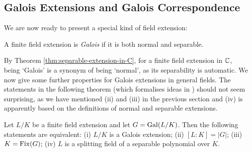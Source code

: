 
 \subsection{Galois Extensions and Galois Correspondence}


We are now ready to present a special kind of field extension:

\begin{definition}
    A finite field extension is \textit{Galois} if it is both normal and separable. 
\end{definition}

By Theorem \ref{thm:separable-extension-in-C}, for a finite field extension in $\mathbb C$, being `Galois' is a synonym of being `normal', as its separability is automatic. 
We now give some further properties for Galois extensions in general fields. The statements in the following theorem (which formalises ideas in \cite[Lecture~8]{galois-theory-lectures}) should not seem surprising, as we have mentioned (ii) and (iii) in the previous section and (iv) is apparently based on the definitions of normal and separable extensions. 


\begin{theorem} \label{thm:fixed}
	Let $L/K$ be a finite field extension and let $G = \operatorname{Gal}(L/K)$. Then the following statements are equivalent:
 	(i) $L/K$ is a Galois extension;
	  (ii) $[L:K] = |G|$;
	  (iii) $K = \operatorname{Fix}(G)$;
	  (iv) $L$ is a splitting field of a separable polynomial over $K$.
\end{theorem}

